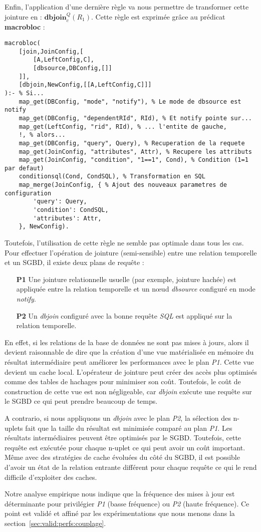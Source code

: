 Enfin, l'application d'une dernière règle va nous permettre de transformer cette jointure en : $\textbf{dbjoin}^Q_c (R_1)$. Cette règle est exprimée grâce au prédicat \textbf{macrobloc} :

\begin{lstlisting}
macrobloc(
    [join,JoinConfig,[
        [A,LeftConfig,C],
        [dbsource,DBConfig,[]]
    ]],
    [dbjoin,NewConfig,[[A,LeftConfig,C]]]
):- % Si...
    map_get(DBConfig, "mode", "notify"), % Le mode de dbsource est notify
    map_get(DBConfig, "dependentRId", RId), % Et notify pointe sur...
    map_get(LeftConfig, "rid", RId), % ... l'entite de gauche,
    !, % alors...
    map_get(DBConfig, "query", Query), % Recuperation de la requete
    map_get(JoinConfig, "attributes", Attr), % Recupere les attributs
    map_get(JoinConfig, "condition", "1==1", Cond), % Condition (1=1 par defaut)
    conditionsql(Cond, CondSQL), % Transformation en SQL
    map_merge(JoinConfig, { % Ajout des nouveaux parametres de configuration
        'query': Query,
        'condition': CondSQL, 
        'attributes': Attr,
    }, NewConfig).
\end{lstlisting}

Toutefois, l'utilisation de cette règle ne semble pas optimale dans tous les cas. Pour effectuer l'opération de jointure (semi-sensible) entre une relation temporelle et un SGBD, il existe deux plans de requête :
\begin{itemize}
    \item[\textbf{P1}] Une jointure relationnelle usuelle (par exemple, jointure hachée) est appliquée entre la relation temporelle et un nœud \textit{dbsource} configuré en mode \textit{notify}.
    \item[\textbf{P2}] Un \textit{dbjoin} configuré avec la bonne requête \textit{SQL} est appliqué sur la relation temporelle.
\end{itemize}

En effet, si les relations de la base de données ne sont pas mises à jours, alors il devient raisonnable de dire que la création d'une vue matérialisée en mémoire du résultat intermédiaire peut améliorer les performances avec le plan \textit{P1}. Cette vue devient un cache local. L'opérateur de jointure peut créer des accès plus optimisés comme des tables de hachages pour minimiser son coût. Toutefois, le coût de construction de cette vue est non négligeable, car \textit{dbjoin} exécute une requête sur le SGBD ce qui peut prendre beaucoup de temps.

A contrario, si nous appliquons un \textit{dbjoin} avec le plan \textit{P2}, la sélection des n-uplets fait que la taille du résultat est minimisée comparé au plan \textit{P1}. Les résultats intermédiaires peuvent être optimisés par le SGBD. Toutefois, cette requête est exécutée pour chaque n-uplet ce qui peut avoir un coût important. Même avec des stratégies de cache évoluées du côté du SGBD, il est possible d'avoir un état de la relation entrante différent pour chaque requête ce qui le rend difficile d'exploiter des caches.

Notre analyse empirique nous indique que la fréquence des mises à jour est déterminante pour privilégier \textit{P1} (basse fréquence) ou \textit{P2} (haute fréquence). Ce point est validé et affiné par les expérimentations que nous menons dans la section~\ref{sec:valid:perfs:couplage}.